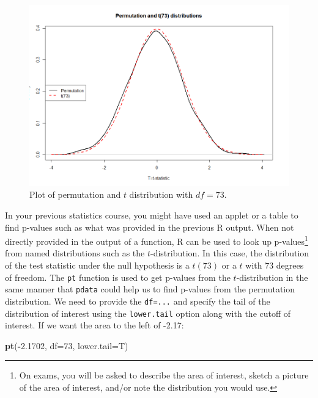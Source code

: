 \documentclass[]{book}
\newenvironment{Shaded}{\begin{snugshade}}{\end{snugshade}}
\newcommand{\KeywordTok}[1]{\textcolor[rgb]{0.13,0.29,0.53}{\textbf{#1}}}
\newcommand{\DataTypeTok}[1]{\textcolor[rgb]{0.13,0.29,0.53}{#1}}
\newcommand{\DecValTok}[1]{\textcolor[rgb]{0.00,0.00,0.81}{#1}}
\newcommand{\FloatTok}[1]{\textcolor[rgb]{0.00,0.00,0.81}{#1}}
\newcommand{\OperatorTok}[1]{\textcolor[rgb]{0.81,0.36,0.00}{\textbf{#1}}}
\newcommand{\NormalTok}[1]{#1}
\let\rmarkdownfootnote\footnote%
\def\footnote{\protect\rmarkdownfootnote}
\begin{document}
\begin{figure}
\includegraphics[width=13.33in]{chapter1_files/image047} \caption{Plot of permutation and \(t\) distribution with \(df=73\).}\label{fig:Figure2-14}
\end{figure}

In your previous statistics course, you might have used an applet or a
table to find p-values such as what was provided in the previous R
output. When not directly provided in the output of a function, R can be
used to look up p-values\footnote{On exams, you will be asked to
  describe the area of interest, sketch a picture of the area of
  interest, and/or note the distribution you would use.} from named
distributions such as the \(t\)-distribution. In this case, the
distribution of the test statistic under the null hypothesis is a
\(t(73)\) or a \(t\) with 73 degrees of freedom. The \texttt{pt}
function is used to get p-values from the \(t\)-distribution in the same
manner that \texttt{pdata} could help us to find p-values from the
permutation distribution. We need to provide the \texttt{df=...} and
specify the tail of the distribution of interest using the
\texttt{lower.tail} option along with the cutoff of interest. If we want
the area to the left of -2.17:

\begin{Shaded}
\begin{Highlighting}[]
\KeywordTok{pt}\NormalTok{(}\OperatorTok{-}\FloatTok{2.1702}\NormalTok{, }\DataTypeTok{df=}\DecValTok{73}\NormalTok{, }\DataTypeTok{lower.tail=}\NormalTok{T)}
\end{Highlighting}
\end{Shaded}
\end{document}
